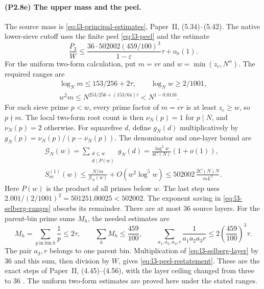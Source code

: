 \paragraph{(P2.8e) The upper mass and the peel.}
The source mass is \eqref{eq:l3-principal-estimates},
Paper~II, (5.34)--(5.42).
The native lower-sieve cutoff uses the finite peel
\eqref{eq:l3-peel} and the estimate
\begin{equation}\label{eq:l3-peel-restatement}
 \frac{P_3}{W}\le
 \frac{36\cdot502002(459/100)^3}{1-\varepsilon}\tau+o_\sigma(1).
\end{equation}
For the uniform two-form calculation, put $m=vr$ and $w=\min(z_c,N^\alpha)$.
The required ranges are
\begin{equation}\label{eq:l3-selberg-ranges}
\begin{gathered}
 \log_Nm\le153/256+2\tau,\qquad \log_Nw\ge2/1001,\\
 w^2m\le N^{253/256+(153/64)\tau}<N^{1-0.0116}.
\end{gathered}
\end{equation}
For each sieve prime $p<w$, every prime factor of $m=vr$ is at least
$z_c\ge w$, so $p\nmid m$. The local two-form root count is then
$\nu_N(p)=1$ for $p\mid N$, and $\nu_N(p)=2$ otherwise.
For squarefree $d$, define $g_N(d)$ multiplicatively by
$g_N(p)=\nu_N(p)/(p-\nu_N(p))$.
The denominator and one-layer bound are
\begin{equation}\label{eq:l3-selberg-layer}
\begin{gathered}
 \mathcal G_N(w)=\sum_{\substack{d\le w\\d\mid P(w)}}g_N(d)
             =\frac{\log^2w}{4C(N)}(1+o(1)),\\
 S^{(1)}_m(w)\le\frac{N/m}{\mathcal G_N(w)}+O(w^2\log^5w)
       \le502002\,\frac{2C(N)N}{mL^2}.
\end{gathered}
\end{equation}
Here $P(w)$ is the product of all primes below $w$.
The last step uses
$2.001/(2/1001)^2=501251.00025<502002$.
The exponent saving in \eqref{eq:l3-selberg-ranges} absorbs its remainder.
There are at most $36$ source layers.
For the parent-bin prime sums $M_h$, the needed estimates are
\begin{equation}\label{eq:l3-peel-harmonic-sums}
 M_h=\sum_{p\ \mathrm{in\ bin}\ h}\frac1p\le2\tau,\qquad
 \sum_hM_h\le\frac{459}{100},\qquad
 \sum_{a_1,a_2,a_3,r}\frac1{a_1a_2a_3r}
       \le2\left(\frac{459}{100}\right)^3\tau.
\end{equation}
The pair $a_3,r$ belongs to one parent bin.
Multiplication of \eqref{eq:l3-selberg-layer} by $36$ and this sum,
then division by $W$, gives \eqref{eq:l3-peel-restatement}.
These are the exact steps of Paper~II, (4.45)--(4.56),
with the layer ceiling changed from three to $36$
\cite[(4.45)--(4.56), (5.34)--(5.42)]{PaperII}.
The uniform two-form estimates are proved here under the stated ranges.
